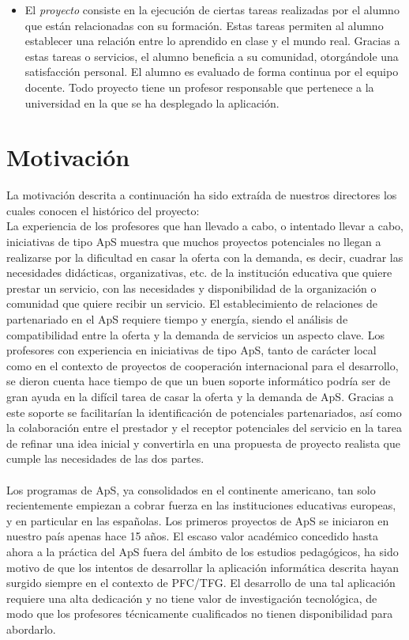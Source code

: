 \documentclass[11pt]{book}
\begin{document}
\begin{itemize}
		\item El \emph{proyecto} consiste en la ejecución de ciertas tareas realizadas por el alumno que están relacionadas con su formación. Estas tareas permiten al alumno establecer una relación entre lo aprendido en clase y el mundo real. Gracias a estas tareas o servicios, el alumno beneficia a su comunidad, otorgándole una satisfacción personal. El alumno es evaluado de forma continua por el equipo docente. Todo proyecto tiene un profesor responsable que pertenece a la universidad en la que se ha desplegado la aplicación.
	\end{itemize}
	\section{Motivación}\label{cap:cont-motidvacion}
	La motivación descrita a continuación ha sido extraída de nuestros directores los cuales conocen el histórico del proyecto:\\
	La experiencia de los profesores que han llevado a cabo, o intentado
	llevar a cabo, iniciativas de tipo ApS muestra
	que muchos proyectos potenciales no llegan a realizarse por la
	dificultad en casar la oferta con la demanda, es decir, cuadrar las
	necesidades didácticas, organizativas, etc. de la institución educativa
	que quiere prestar un servicio, con las necesidades y disponibilidad de
	la organización o comunidad que quiere recibir un servicio. El
	establecimiento de relaciones de partenariado en el ApS requiere tiempo
	y energía, siendo el análisis de compatibilidad entre la oferta y la
	demanda de servicios un aspecto clave. Los profesores con experiencia en
	iniciativas de tipo ApS, tanto de carácter local como en el contexto de
	proyectos de cooperación internacional para el desarrollo, se dieron
	cuenta hace tiempo de que un buen soporte informático podría ser de gran
	ayuda en la difícil tarea de casar la oferta y la demanda de ApS.
	Gracias a este soporte se facilitarían la identificación de potenciales
	partenariados, así como la colaboración entre el prestador y el receptor
	potenciales del servicio en la tarea de refinar una idea inicial y
	convertirla en una propuesta de proyecto realista que cumple las
	necesidades de las dos partes.\\\\
	
	Los programas de ApS, ya consolidados en el continente americano, tan
	solo recientemente empiezan a cobrar fuerza en las instituciones
	educativas europeas, y en particular en las españolas. Los primeros
	proyectos de ApS se iniciaron en nuestro país apenas hace 15 años.  El
	escaso valor académico concedido hasta ahora a la práctica del ApS fuera
	del ámbito de los estudios pedagógicos, ha sido motivo de que los
	intentos de desarrollar la aplicación informática descrita hayan surgido
	siempre en el contexto de PFC/TFG. El desarrollo de una tal aplicación
	requiere una alta dedicación y no tiene valor de investigación
	tecnológica, de modo que los profesores técnicamente cualificados no
	tienen disponibilidad para abordarlo.\\\\
	
\end{document}
